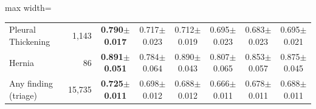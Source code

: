 \begin{table}[H]
\begin{adjustbox}{max width=\linewidth}
\begin{tabular}{lrcccccc}
Pleural Thickening & 1,143 & \textbf{0.790$\pm$0.017} & 0.717$\pm$0.023 & 0.712$\pm$0.019 & 0.695$\pm$0.023 & 0.683$\pm$0.023 & 0.695$\pm$0.021 \\
Hernia & 86 & \textbf{0.891$\pm$0.051} & 0.784$\pm$0.064 & 0.890$\pm$0.043 & 0.807$\pm$0.065 & 0.853$\pm$0.057 & 0.875$\pm$0.045 \\
Any finding (triage) & 15,735 & \textbf{0.725$\pm$0.011} & 0.698$\pm$0.012 & 0.688$\pm$0.012 & 0.666$\pm$0.011 & 0.678$\pm$0.011 & 0.688$\pm$0.011 \\
\bottomrule
\end{tabular}
\end{adjustbox}
\end{table}
